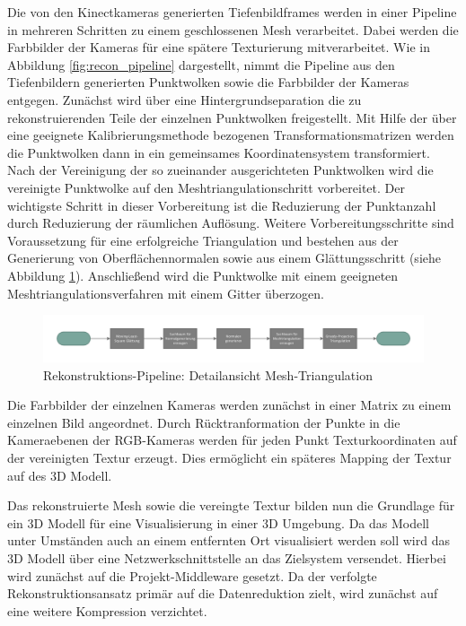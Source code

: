 Die von den Kinectkameras generierten Tiefenbildframes werden in einer Pipeline 
in mehreren Schritten zu einem geschlossenen Mesh verarbeitet. Dabei werden die
Farbbilder der Kameras für eine spätere Texturierung mitverarbeitet. Wie in 
Abbildung \ref{fig:recon_pipeline} dargestellt, nimmt die Pipeline aus den 
Tiefenbildern generierten Punktwolken sowie die Farbbilder der Kameras entgegen.
Zunächst wird über eine Hintergrundseparation die zu rekonstruierenden Teile der 
einzelnen Punktwolken freigestellt. Mit Hilfe der über eine geeignete 
Kalibrierungsmethode bezogenen Transformationsmatrizen werden die Punktwolken 
dann in ein gemeinsames Koordinatensystem transformiert. Nach der Vereinigung 
der so zueinander ausgerichteten Punktwolken wird die vereinigte Punktwolke auf 
den Meshtriangulationschritt vorbereitet. Der wichtigste Schritt in dieser 
Vorbereitung ist die Reduzierung der Punktanzahl durch Reduzierung der räumlichen 
Auflösung. Weitere Vorbereitungsschritte sind Voraussetzung für eine erfolgreiche 
Triangulation und bestehen aus der Generierung von Oberflächennormalen sowie aus 
einem Glättungsschritt (siehe Abbildung \ref{fig:recon_pipeline_tri}). Anschließend wird 
die Punktwolke mit einem geeigneten Meshtriangulationsverfahren mit einem Gitter 
überzogen.

\begin{figure}[H]
	\centering
	\includegraphics[width=\textwidth]{figs/tri_pipe}
	\caption{Rekonstruktions-Pipeline: Detailansicht Mesh-Triangulation}
	\label{fig:recon_pipeline_tri}
\end{figure}

Die Farbbilder der einzelnen Kameras werden zunächst in einer Matrix zu einem 
einzelnen Bild angeordnet. Durch Rücktranformation der Punkte in die 
Kameraebenen der RGB-Kameras werden für jeden Punkt Texturkoordinaten auf der 
vereinigten Textur erzeugt. Dies ermöglicht ein späteres Mapping der Textur auf 
des 3D Modell.

Das rekonstruierte Mesh sowie die vereingte Textur bilden nun die Grundlage für 
ein 3D Modell für eine Visualisierung in einer 3D Umgebung. Da das Modell unter 
Umständen auch an einem entfernten Ort visualisiert werden soll wird das 3D 
Modell über eine Netzwerkschnittstelle an das Zielsystem versendet. Hierbei wird 
zunächst auf die Projekt-Middleware gesetzt. Da der verfolgte Rekonstruktionsansatz 
primär auf die Datenreduktion zielt, wird zunächst auf eine weitere Kompression verzichtet.


